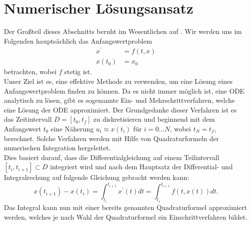 \section{Numerischer Lösungsansatz}
Der Großteil dieses Abschnitts beruht im Wesentlichen auf \cite[63-79]{stykelSkriptZurVorlesung2020}.
Wir werden uns im Folgenden hauptsächlich das Anfangswertproblem
\begin{align}
    \label{first-order-num}
    x^{\prime} &= f(t,x) \nonumber \\
    x(t_0) &= x_0
\end{align}
betrachten, wobei $f$ stetig ist.\\
Unser Ziel ist es, eine effektive Methode zu verwenden, um eine Lösung eines Anfangswertproblem finden zu können.
Da es nicht immer möglich ist, eine ODE analytisch zu lösen, gibt es sogenannte Ein- und Mehrschrittverfahren, welche
eine Lösung der ODE approximiert.
Der Grundgedanke dieser Verfahren ist es das Zeitintervall $D=[t_0,t_f]$ zu diskretisieren und beginnend mit dem
Anfangswert $t_0$ eine Näherung $u_i \approx x(t_i)$ für $i=0 \dots N$, wobei $t_N=t_f$, berechnet.
Solche Verfahren werden mit Hilfe von Quadraturformeln der numerischen
Integration \cite[Numerische Integration]{walzLexikonMathematik} hergeleitet.\\
Dies basiert darauf, dass die Differentialgleichung auf einem Teilintervall $[t_i, t_{i+1}] \subset D$
integriert wird und nach dem Hauptsatz der Differential- und Integralrechung auf folgende Gleichung gebracht werden kann:
\[
    x(t_{i+1}) - x(t_i) = \int_{t_i}^{t_{i+1}} x^{\prime}(t)dt = \int_{t_i}^{t_{i+1}}f(t, x(t))dt.
\]
Das Integral kann nun mit einer bereits genannten Quadraturformel approximiert werden, welches je nach Wahl der
Quadraturformel ein Einschrittverfahren bildet.
